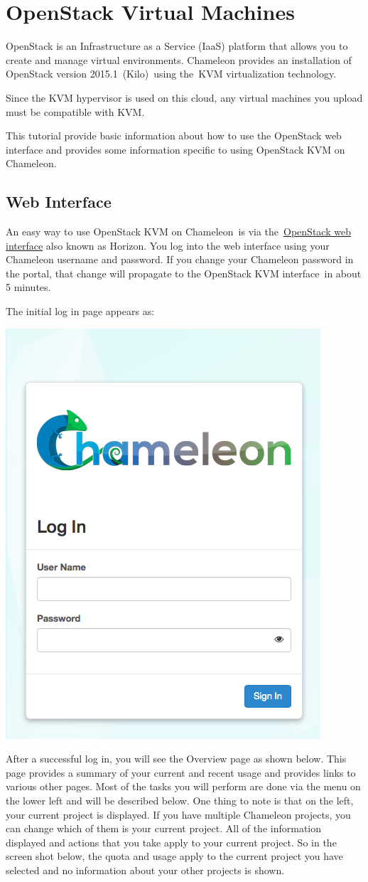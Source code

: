 

\chapter{OpenStack Virtual Machines}
\label{C:cc-guide}

\FILENAME

OpenStack is an Infrastructure as a Service (IaaS) platform that allows
you to create and manage virtual environments. Chameleon provides an
installation of OpenStack version 2015.1~(Kilo)~using the~KVM
virtualization technology.

Since the KVM hypervisor is used on this cloud, any virtual machines you
upload must be compatible with KVM.

This tutorial provide basic information about how to use the OpenStack
web interface and provides some information specific to using OpenStack
KVM on Chameleon.

\section{Web Interface}\label{web-interface-horizon}

An easy way to use OpenStack KVM on Chameleon~is via
the~\href{https://openstack.tacc.chameleoncloud.org/dashboard}{OpenStack
  web interface} also known as Horizon. You log into the web interface
using your Chameleon username and password. If you change your
Chameleon password in the portal, that change will propagate to the
OpenStack KVM interface~in about 5 minutes.

The initial log in page appears as:

\begin{center}
\includegraphics[width=0.3\columnwidth]{images/chameleon/chameleon-login.png}
\end{center}

After a successful log in, you will see the Overview page as shown
below. This page provides a summary of your current and recent usage and
provides links to various other pages. Most of the tasks you will
perform are done via the menu on the lower left and will be described
below. One thing to note is that on the left, your current project is
displayed. If you have multiple Chameleon projects, you can change which
of them is your current project. All of the information displayed and
actions that you take apply to your current project. So in the screen
shot below, the quota and usage apply to the current project you have
selected and no information about your other projects is shown.

